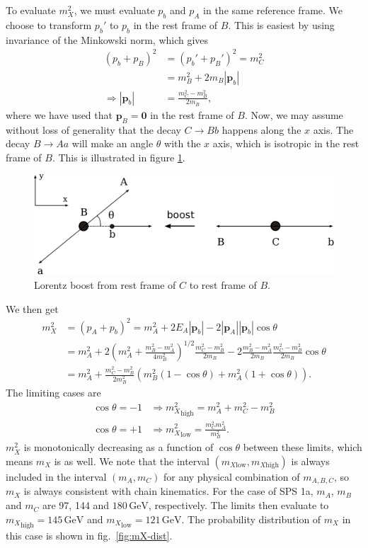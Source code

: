 \documentclass[twoside,english]{uiofysmaster}
\begin{document}
To evaluate $m_X^2$, we must evaluate $p_b$ and $p_A$ in the same reference frame. We choose to transform $p_b'$ to $p_b$ in the rest frame of $B$. This is easiest by using invariance of the Minkowski norm, which gives
\begin{align}
	(p_b + p_B)^2 &= (p_b' + p_B')^2 = m_C^2\nonumber \\
				  &= m_B^2 + 2m_B|\mathbf{p}_b|\\
	\Rightarrow |\mathbf{p}_b| &= \frac{m_C^2 - m_B^2}{2m_B},\nonumber
\end{align}
where we have used that $\mathbf p_B = \mathbf{0}$ in the rest frame of $B$. Now, we may assume without loss of generality that the decay $C\to Bb$ happens along the $x$ axis. The decay $B\to Aa$ will make an angle $\theta$ with the $x$ axis, which is isotropic in the rest frame of $B$. This is illustrated in figure \ref{fig:lorentz_boost}.
\begin{figure}[hbt]
\centering
\includegraphics[scale=0.7]{figures/appendix/lorentz_boost.pdf}
\caption{Lorentz boost from rest frame of $C$ to rest frame of $B$.}
\label{fig:lorentz_boost}
\end{figure}
We then get
\begin{align}
	m_X^2 &= (p_A + p_b)^2 = m_A^2 + 2E_A|\mathbf{p}_b| - 2|\mathbf{p}_A||\mathbf{p}_b|\cos\theta\\
		&= m_A^2 + 2\left( m_A^2 + \frac{m_B^2 - m_A^2}{4m_B^2} \right)^{1/2}\frac{m_C^2 - m_B^2}{2m_B} -2\frac{m_B^2-m_A^2}{2m_B}\frac{m_C^2 - m_B^2}{2m_B}\cos\theta\nonumber \\
		&= m_A^2 + \frac{m_C^2 - m_B^2}{2m_B^2}\left( m_B^2(1-\cos\theta) + m_A^2(1+\cos\theta) \right).\nonumber
\end{align}
The limiting cases are
\begin{align}
	\cos\theta = -1 &\Rightarrow {m_X^2}_\mathrm{high} = m_A^2 + m_C^2 - m_B^2\\
	\cos\theta = +1 &\Rightarrow {m_X^2}_\mathrm{low} = \frac{m_C^2 m_A^2}{m_B^2}.\nonumber
\end{align}
$m_X^2$ is monotonically decreasing as a function of $\cos\theta$ between these limits, which means $m_X$ is as well. We note that the interval $(m_{X\mathrm{low}},m_{X\mathrm{high}})$ is always included in the interval $(m_A, m_C)$ for any physical combination of $m_{A,B,C}$, so $m_X$ is always consistent with chain kinematics. For the case of SPS 1a, $m_A$, $m_B$ and $m_C$ are 97, 144 and $180\,\mathrm{GeV}$, respectively. The limits then evaluate to ${m_X}_\mathrm{high} = 145 \,\mathrm{GeV}$ and ${m_X}_\mathrm{low} = 121 \, \mathrm{GeV}$. The probability distribution of $m_X$ in this case is shown in fig.\ \ref{fig:mX-dist}. 
\end{document}
